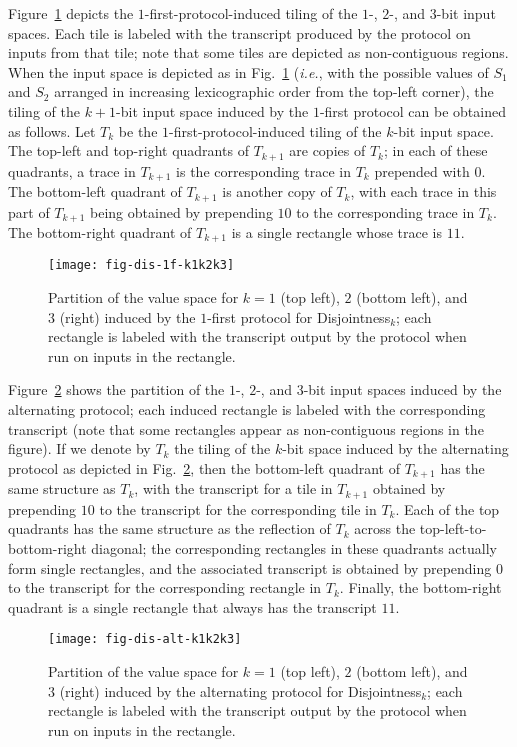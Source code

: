 \documentclass{article}
\theoremstyle{theorem}
\theoremstyle{definition}
\theoremstyle{remark}
\newcommand{\ie}{\emph{i.e.}}
\newcommand{\disjoint}{{\sc Dis\-joint\-ness}\ensuremath{_k}}
\begin{document}
Figure~\ref{fig:dis-1f-k1k2k3} depicts the $1$-first-protocol-induced tiling of the $1$-, $2$-, and $3$-bit input spaces.  Each tile is labeled with the transcript produced by the protocol on inputs from that tile; note that some tiles are depicted as non-contiguous regions.  When the input space is depicted as in Fig.~\ref{fig:dis-1f-k1k2k3} (\ie, with the possible values of $S_1$ and $S_2$ arranged in increasing lexicographic order from the top-left corner), the tiling of the $k+1$-bit input space induced by the $1$-first protocol can be obtained as follows.  Let $T_k$ be the $1$-first-protocol-induced tiling of the $k$-bit input space.  The top-left and top-right quadrants of $T_{k+1}$ are copies of $T_k$; in each of these quadrants, a trace in $T_{k+1}$ is the corresponding trace in $T_k$ prepended with $0$.  The bottom-left quadrant of $T_{k+1}$ is another copy of $T_k$, with each trace in this part of $T_{k+1}$ being obtained by prepending $10$ to the corresponding trace in $T_k$.  The bottom-right quadrant of $T_{k+1}$ is a single rectangle whose trace is $11$.
\begin{figure}[htp]
\begin{center}
\texttt{[image: fig-dis-1f-k1k2k3]}
\caption{Partition of the value space for $k=1$ (top left), $2$ (bottom left), and $3$ (right) induced by the $1$-first protocol for \disjoint; each rectangle is labeled with the transcript output by the protocol when run on inputs in the rectangle.}\label{fig:dis-1f-k1k2k3}
\end{center}
\end{figure}

Figure~\ref{fig:dis-alt-k1k2k3} shows the partition of the $1$-, $2$-, and $3$-bit input spaces induced by the alternating protocol; each induced rectangle is labeled with the corresponding transcript (note that some rectangles appear as non-contiguous regions in the figure).  If we denote by $T_k$ the tiling of the $k$-bit space induced by the alternating protocol as depicted in Fig.~\ref{fig:dis-alt-k1k2k3}, then the bottom-left quadrant of $T_{k+1}$ has the same structure as $T_k$, with the transcript for a tile in $T_{k+1}$ obtained by prepending $10$ to the transcript for the corresponding tile in $T_k$.  Each of the top quadrants has the same structure as the reflection of $T_k$ across the top-left-to-bottom-right diagonal; the corresponding rectangles in these quadrants actually form single rectangles, and the associated transcript is obtained by prepending $0$ to the transcript for the corresponding rectangle in $T_k$.  Finally, the bottom-right quadrant is a single rectangle that always has the transcript $11$.
\begin{figure}[htp]
\begin{center}
\texttt{[image: fig-dis-alt-k1k2k3]}
\caption{Partition of the value space for $k=1$ (top left), $2$ (bottom left), and $3$ (right) induced by the alternating protocol for \disjoint; each rectangle is labeled with the transcript output by the protocol when run on inputs in the rectangle.}\label{fig:dis-alt-k1k2k3}
\end{center}
\end{figure}
\end{document}
